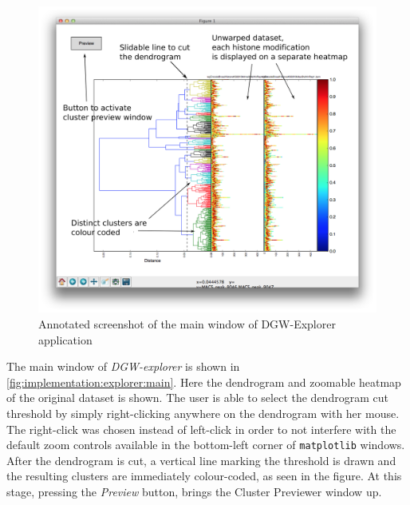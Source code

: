 \documentclass[parskip]{cs4rep}
\newcommand{\pythonpackage}[1]{{\tt #1}}
\begin{document}
\begin{figure}[p]
   \centering
       \includegraphics[height=0.45\textheight]{figures/implementation/explorer/main-window.png}
       
   \caption{Annotated screenshot of the main window of DGW-Explorer application}
   \label{fig:implementation:explorer:main}
\end{figure}

The main window of \emph{DGW-explorer} is shown in \autoref{fig:implementation:explorer:main}.
Here the dendrogram and zoomable heatmap of the original dataset is shown. The user is able to select the dendrogram cut threshold by simply right-clicking anywhere on the dendrogram with her mouse. 
The right-click was chosen instead of left-click in order to not interfere with the default zoom controls available in the bottom-left corner of \pythonpackage{matplotlib} windows. After the dendrogram is cut, a vertical line marking the threshold is drawn and the resulting clusters are immediately colour-coded, as seen in the figure. At this stage, pressing the \emph{Preview} button, brings the Cluster Previewer window up.
\end{document}
